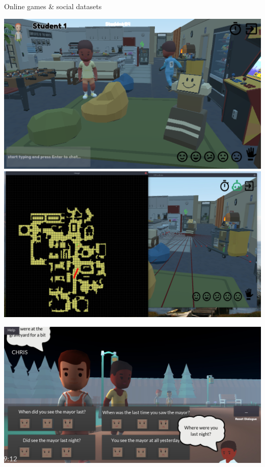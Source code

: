 \documentclass[xcolor=table]{beamer}
\begin{document}
\begin{frame}{Online games \& social datasets}
    \begin{center}
        \includegraphics[width=0.45\linewidth]{figs/online-game/officebots-screenshot-2.png}
        \includegraphics[width=0.45\linewidth]{figs/online-game/officebots-map.jpg}
    \end{center}

    \begin{center}
        \includegraphics[width=0.6\linewidth]{figs/online-game/graveyard-detective-screenshot.jpg}
    \end{center}



\end{frame}
\end{document}
